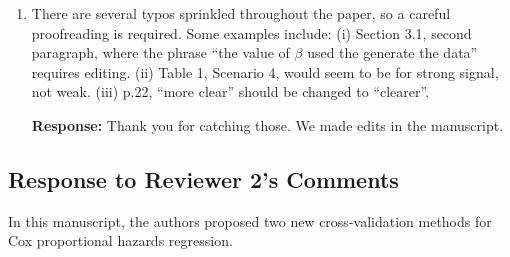 \documentclass[12]{article}
\newcommand{\re}{\textbf{Response: }}
\newcommand\bd[1]{{\color{blue}#1}}
\begin{document}
\begin{enumerate}[align = left]
\re \bd{maybe the easiest way is to use more alpha values in this example?}

\item There are several typos sprinkled throughout the paper, so a careful proofreading is required. Some examples include: (i) Section 3.1, second paragraph, where the phrase “the value of $\beta$ used the generate the data” requires editing. (ii) Table 1, Scenario 4, would seem to be for
strong signal, not weak. (iii) p.22, “more clear” should be changed to “clearer”.

\re Thank you for catching those. We made edits in the manuscript.

\end{enumerate}

\subsection*{Response to Reviewer 2's Comments}
In this manuscript, the authors proposed two new cross-validation methods for Cox proportional hazards regression.
\end{document}
